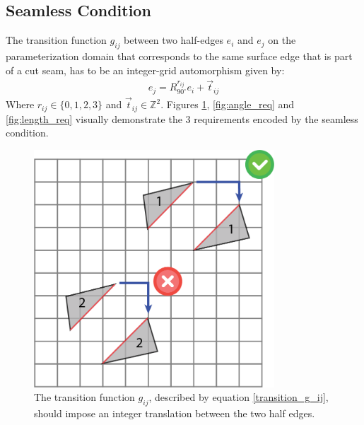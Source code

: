 \subsection{Seamless Condition}
\label{label:seamless_cond}
The transition function $g_{ij}$ between two half-edges $e_i$ and $e_j$ on the parameterization domain that corresponds to the same surface edge that is part of a cut seam, has to be an integer-grid automorphism given by:
\begin{equation}\label{transition_g_ij}
\begin{split}
e_j = R^{r_{ij}}_{90^\circ}e_i + \vec{t}_{ij}
\end{split}
\end{equation}
Where  $r_{ij} \in \{0,1,2,3\}$ and $\vec{t}_{ij} \in \mathbb{Z}^2$. Figures \ref{fig:translation_req}, \ref{fig:angle_req} and \ref{fig:length_req} visually demonstrate the 3 requirements encoded by the seamless condition.
  
\begin{figure}[ht]
\centering
\includegraphics[width=9cm]{figures/seamless/translation.png}
\caption[The Translation Requirement]{The transition function $g_{ij}$, described by equation \ref{transition_g_ij}, should impose an integer translation between the two half edges.}
\label{fig:translation_req}
\end{figure}

